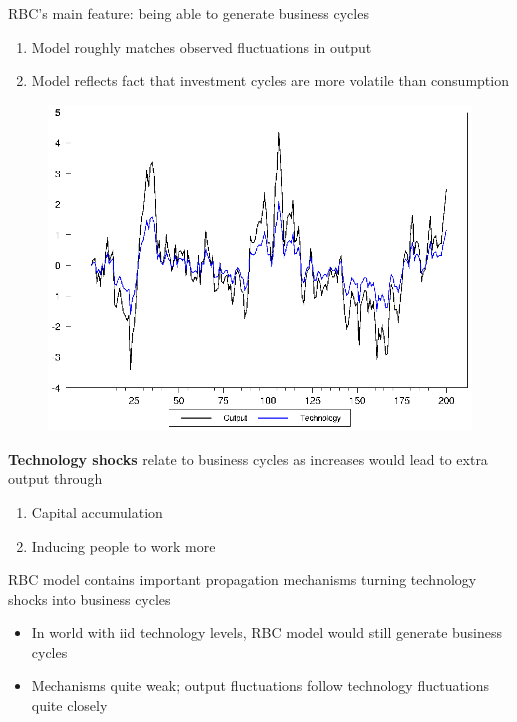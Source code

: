 \documentclass{beamer}
\begin{document}
\begin{frame}
  RBC's main feature: being able to generate business cycles\\  
\begin{enumerate}
  \item Model roughly matches observed fluctuations in output
  \item Model reflects fact that investment cycles are more volatile than consumption
\end{enumerate}
\end{frame}

\begin{frame}
  \begin{figure}
    \includegraphics[scale=.9]{rbc2.eps}
  \end{figure}
\end{frame}

\begin{frame}
  \textbf{Technology shocks} relate to business cycles as increases would lead to extra output through
  \begin{enumerate}
    \item Capital accumulation
    \item Inducing people to work more
  \end{enumerate}
  \medskip
  RBC model contains important propagation mechanisms turning technology shocks into business cycles
  \begin{itemize}
    \item In world with iid technology levels, RBC model would still generate business cycles
    \item Mechanisms quite weak; output fluctuations follow technology fluctuations quite closely
  \end{itemize}
\end{frame}
\end{document}
